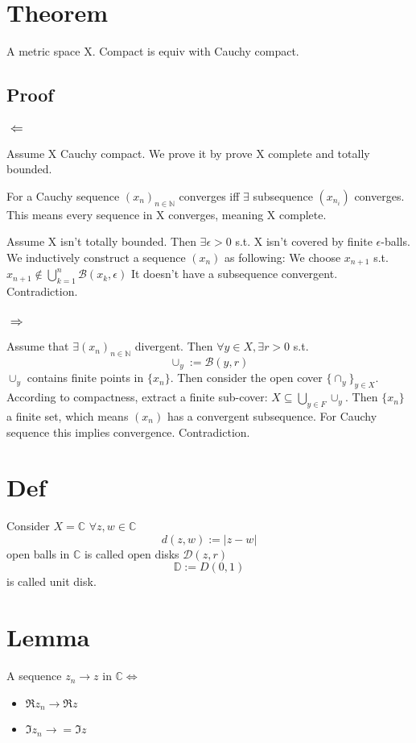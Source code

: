 \documentclass{book}
\newcommand{\abs}[1]{\left\lvert #1 \right\rvert}
\begin{document}
\section{Theorem}A metric space X. Compact is equiv with Cauchy compact.
\subsection*{Proof}
\subsubsection{$\Leftarrow$}
Assume X Cauchy compact. We prove it by prove X complete and totally bounded. 

For a Cauchy sequence $(x_n)_{n\in \mathbb N}$ converges iff $\exists$ subsequence $(x_{n_i})$ converges. This means every sequence in X converges, meaning X complete.

Assume X isn't totally bounded. Then $\exists \epsilon>0$ s.t. X isn't covered by finite $\epsilon$-balls. We inductively construct a sequence $(x_n)$ as following: We choose $x_{n+1}$ s.t. $x_{n+1}\not\in \bigcup\limits_{k=1}^n\mathcal B(x_k,\epsilon)$ It doesn't have a subsequence convergent. Contradiction.
\subsubsection{$\Rightarrow$}
Assume that $\exists(x_n)_{n\in \mathbb N}$ divergent. Then $\forall y\in X,\exists r>0$ s.t. $$\cup_y:=\mathcal B(y,r)$$
$\cup_y$ contains finite points in $\{x_n\}$. Then consider the open cover $\{\cap_y\}_{y\in X}$. According to compactness, extract a finite sub-cover: $X\subseteq\bigcup\limits_{y\in F}\cup_y$. Then $\{x_n\}$ a finite set, which means $(x_n)$ has a convergent subsequence. For Cauchy sequence this implies convergence. Contradiction.
\section{Def}
Consider $X=\mathbb C$ $\forall z,w\in \mathbb C$ $$d(z,w):=\abs{z-w}$$ open balls in $\mathbb C$ is called open disks $\mathcal D(z,r)$ $$\mathbb D:=D(0,1)$$ is called unit disk.
\section{Lemma}A sequence $z_n\rightarrow z$ in $\mathbb C$$\Leftrightarrow$ \begin{itemize}
    \item $\Re z_n\rightarrow\Re z$
    \item $\Im z_n\rightarrow =\Im z$
\end{itemize}
\end{document}
